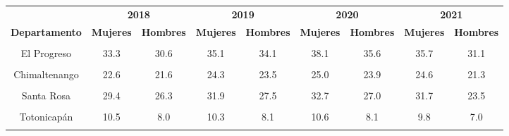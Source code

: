 \begin{tabular}[t]{ccccccccc}
\toprule
\multicolumn{1}{c}{\textbf{ }} & \multicolumn{2}{c}{\textbf{2018}} & \multicolumn{2}{c}{\textbf{2019}} & \multicolumn{2}{c}{\textbf{2020}} & \multicolumn{2}{c}{\textbf{2021}} \\
\cmidrule(l{3pt}r{3pt}){2-3} \cmidrule(l{3pt}r{3pt}){4-5} \cmidrule(l{3pt}r{3pt}){6-7} \cmidrule(l{3pt}r{3pt}){8-9}
\textbf{Departamento} & \textbf{Mujeres} & \textbf{Hombres} & \textbf{Mujeres} & \textbf{Hombres} & \textbf{Mujeres} & \textbf{Hombres} & \textbf{Mujeres} & \textbf{Hombres}\\
\midrule
\cellcolor[HTML]{B6B3FF}{Guatemala} & \cellcolor[HTML]{B6B3FF}{51.1} & \cellcolor[HTML]{B6B3FF}{46.1} & \cellcolor[HTML]{B6B3FF}{53.4} & \cellcolor[HTML]{B6B3FF}{48.1} & \cellcolor[HTML]{B6B3FF}{54.2} & \cellcolor[HTML]{B6B3FF}{49.2} & \cellcolor[HTML]{B6B3FF}{50.3} & \cellcolor[HTML]{B6B3FF}{43.9}\\
El Progreso & 33.3 & 30.6 & 35.1 & 34.1 & 38.1 & 35.6 & 35.7 & 31.1\\
\cellcolor[HTML]{B6B3FF}{Sacatepéquez} & \cellcolor[HTML]{B6B3FF}{35.6} & \cellcolor[HTML]{B6B3FF}{28.4} & \cellcolor[HTML]{B6B3FF}{37.0} & \cellcolor[HTML]{B6B3FF}{30.5} & \cellcolor[HTML]{B6B3FF}{37.6} & \cellcolor[HTML]{B6B3FF}{32.3} & \cellcolor[HTML]{B6B3FF}{35.9} & \cellcolor[HTML]{B6B3FF}{29.3}\\
Chimaltenango & 22.6 & 21.6 & 24.3 & 23.5 & 25.0 & 23.9 & 24.6 & 21.3\\
\cellcolor[HTML]{B6B3FF}{Escuintla} & \cellcolor[HTML]{B6B3FF}{28.4} & \cellcolor[HTML]{B6B3FF}{25.1} & \cellcolor[HTML]{B6B3FF}{29.0} & \cellcolor[HTML]{B6B3FF}{26.6} & \cellcolor[HTML]{B6B3FF}{24.6} & \cellcolor[HTML]{B6B3FF}{27.1} & \cellcolor[HTML]{B6B3FF}{29.5} & \cellcolor[HTML]{B6B3FF}{24.5}\\
Santa Rosa & 29.4 & 26.3 & 31.9 & 27.5 & 32.7 & 27.0 & 31.7 & 23.5\\
\cellcolor[HTML]{B6B3FF}{Sololá} & \cellcolor[HTML]{B6B3FF}{22.3} & \cellcolor[HTML]{B6B3FF}{17.7} & \cellcolor[HTML]{B6B3FF}{22.6} & \cellcolor[HTML]{B6B3FF}{17.3} & \cellcolor[HTML]{B6B3FF}{22.5} & \cellcolor[HTML]{B6B3FF}{16.9} & \cellcolor[HTML]{B6B3FF}{20.3} & \cellcolor[HTML]{B6B3FF}{13.7}\\
Totonicapán & 10.5 & 8.0 & 10.3 & 8.1 & 10.6 & 8.1 & 9.8 & 7.0\\
\cellcolor[HTML]{B6B3FF}{Quetzaltenango} & \cellcolor[HTML]{B6B3FF}{34.5} & \cellcolor[HTML]{B6B3FF}{33.8} & \cellcolor[HTML]{B6B3FF}{32.9} & \cellcolor[HTML]{B6B3FF}{33.1} & \cellcolor[HTML]{B6B3FF}{32.4} & \cellcolor[HTML]{B6B3FF}{32.6} & \cellcolor[HTML]{B6B3FF}{28.7} & \cellcolor[HTML]{B6B3FF}{26.8}\\

\end{tabular}
